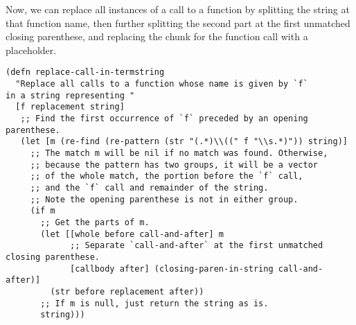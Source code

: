 \documentclass[11pt]{article}
\begin{document}
Now, we can replace all instances of a call to a function
by splitting the string at that function name,
then further splitting the second part at
the first unmatched closing parenthese,
and replacing the chunk for the function call with a placeholder.
\begin{verbatim}
(defn replace-call-in-termstring
  "Replace all calls to a function whose name is given by `f`
in a string representing "
  [f replacement string]
   ;; Find the first occurrence of `f` preceded by an opening parenthese.
   (let [m (re-find (re-pattern (str "(.*)\\((" f "\\s.*)")) string)]
     ;; The match m will be nil if no match was found. Otherwise,
     ;; because the pattern has two groups, it will be a vector
     ;; of the whole match, the portion before the `f` call,
     ;; and the `f` call and remainder of the string.
     ;; Note the opening parenthese is not in either group.
     (if m
       ;; Get the parts of m.
       (let [[whole before call-and-after] m
             ;; Separate `call-and-after` at the first unmatched closing parenthese.
             [callbody after] (closing-paren-in-string call-and-after)]
         (str before replacement after))
       ;; If m is null, just return the string as is.
       string)))
\end{verbatim}
\end{document}
